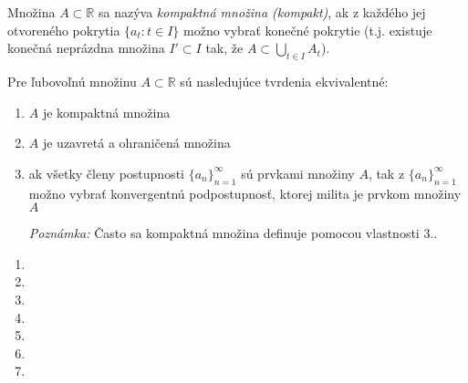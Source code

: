 Množina $A \subset \mathbb{R}$ sa nazýva \textit{kompaktná množina (kompakt)},
ak z každého jej otvoreného pokrytia $\{a_t: t \in I\}$ možno vybrať konečné
pokrytie (t.j. existuje konečná neprázdna množina $I' \subset I$ tak, že $A
\subset \bigcup_{t \in I} A_t$).

\begin{veta}
Pre ľubovoľnú množinu $A \subset \mathbb{R}$ sú nasledujúce tvrdenia
ekvivalentné:
\begin{enumerate}
\item $A$ je kompaktná množina
\item $A$ je uzavretá a ohraničená množina
\item
    ak všetky členy postupnosti ${\{a_n\}}_{n=1}^\infty$ sú prvkami množiny
    $A$, tak z ${\{a_n\}}_{n=1}^\infty$ možno vybrať konvergentnú podpostupnosť,
    ktorej milita je prvkom množiny $A$

\textit{Poznámka:}
Často sa kompaktná množina definuje pomocou vlastnosti $3.$.
\end{enumerate}
\end{veta}

\begin{enumerate}[resume]
    \item {}
    \item {}
    \item {}
    \item {}
    \item {}
    \item {}
    \item {}
\end{enumerate}
